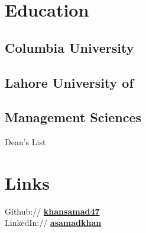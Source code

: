 \documentclass[letterpaper]{deedy-resume} %
\begin{document}
\begin{minipage}[t]{0.33\textwidth} %


\section{Education} 

\subsection{Columbia University}


\sectionspace %


\subsection{Lahore University of }
\subsection{Management Sciences}

Dean's List \\

\sectionspace %


\section{Links} 

Github:// \href{https://github.com/khansamad47}{\bf khansamad47} \\
LinkedIn:// \href{https://www.linkedin.com/in/asamadkhan}{\bf asamadkhan} \\


\end{minipage}
\end{document}
